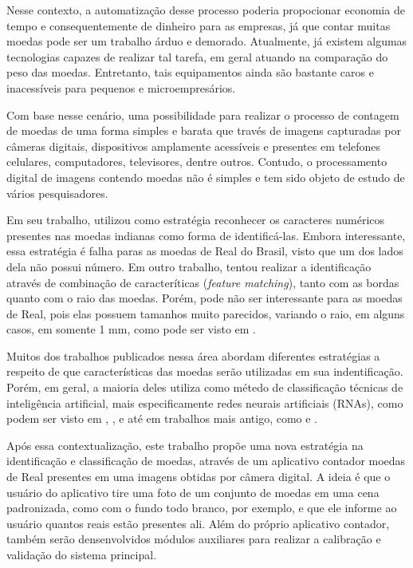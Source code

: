 \documentclass[10pt,journal,compsoc]{IEEEtran}
\begin{document}
Nesse contexto, a automatização desse processo poderia propocionar economia de tempo e consequentemente de dinheiro para as empresas, já que contar muitas moedas pode ser um trabalho árduo e demorado. Atualmente, já existem algumas tecnologias capazes de realizar tal tarefa, em geral atuando na comparação do peso das moedas. Entretanto, tais equipamentos ainda são bastante caros e inacessíveis para pequenos e microempresários.

Com base nesse cenário, uma possibilidade para realizar o processo de contagem de moedas de uma forma simples e barata que través de imagens capturadas por câmeras digitais, dispositivos amplamente acessíveis e presentes em telefones celulares, computadores, televisores, dentre outros. Contudo, o processamento digital de imagens contendo moedas não é simples e tem sido objeto de estudo de vários pesquisadores.

Em seu trabalho, \cite{bremananth2005new} utilizou como estratégia reconhecer os caracteres numéricos presentes nas moedas indianas como forma de identificá-las. Embora interessante, essa estratégia é falha paras as moedas de Real do Brasil, visto que um dos lados dela não possui número. Em outro trabalho, \cite{chetan2013robust} tentou realizar a identificação através de combinação de caracteríticas (\textit{feature matching}), tanto com as bordas quanto com o raio das moedas. Porém, pode não ser interessante para as moedas de Real, pois elas possuem tamanhos muito parecidos, variando o raio, em alguns casos, em somente 1 mm, como pode ser visto em \cite{bcb}.

Muitos dos trabalhos publicados nessa área abordam diferentes estratégias a respeito de que características das moedas serão utilizadas em sua indentificação. Porém, em geral, a maioria deles utiliza como métedo de classificação técnicas de inteligência artificial, mais especificamente redes neurais artificiais (RNAs), como podem ser visto em \cite{bremananth2005new}, \cite{kaur2015coin}, \cite{modi2013automated} e até em trabalhos mais antigo, como e \cite{fukumi1992rotation}.

Após essa contextualização, este trabalho propõe uma nova estratégia na identificação e classificação de moedas, através de um aplicativo contador moedas de Real presentes em uma imagens obtidas por câmera digital. A ideia é que o usuário do aplicativo tire uma foto de um conjunto de moedas em uma cena padronizada, como com o fundo todo branco, por exemplo, e que ele informe ao usuário quantos reais estão presentes ali. Além do próprio aplicativo contador, também serão densenvolvidos módulos auxiliares para realizar a calibração e validação do sistema principal.
\end{document}
